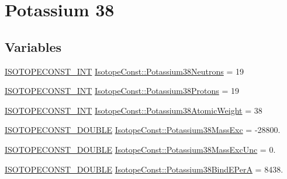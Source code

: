\hypertarget{group___isotope_const-_potassium-_k38}{}\section{Potassium 38}
\label{group___isotope_const-_potassium-_k38}
\subsection*{Variables}
\begin{DoxyCompactItemize}
\item 
\mbox{\hyperlink{group___isotope_const-_macros_ga5f18360b3e99483a35c32d789e62621c}{I\+S\+O\+T\+O\+P\+E\+C\+O\+N\+S\+T\+\_\+\+I\+NT}} \mbox{\hyperlink{group___isotope_const-_potassium-_k38_ga20525e9ff4021c64c6def533ea2b3036}{Isotope\+Const\+::\+Potassium38\+Neutrons}} = 19
\item 
\mbox{\hyperlink{group___isotope_const-_macros_ga5f18360b3e99483a35c32d789e62621c}{I\+S\+O\+T\+O\+P\+E\+C\+O\+N\+S\+T\+\_\+\+I\+NT}} \mbox{\hyperlink{group___isotope_const-_potassium-_k38_ga781bd2a6ff81f406e0a633fef6e0f3a6}{Isotope\+Const\+::\+Potassium38\+Protons}} = 19
\item 
\mbox{\hyperlink{group___isotope_const-_macros_ga5f18360b3e99483a35c32d789e62621c}{I\+S\+O\+T\+O\+P\+E\+C\+O\+N\+S\+T\+\_\+\+I\+NT}} \mbox{\hyperlink{group___isotope_const-_potassium-_k38_ga14a408117435036223d328c3d5228bdb}{Isotope\+Const\+::\+Potassium38\+Atomic\+Weight}} = 38
\item 
\mbox{\hyperlink{group___isotope_const-_macros_ga8f45a7272ce02c0b4c65c44636ed719a}{I\+S\+O\+T\+O\+P\+E\+C\+O\+N\+S\+T\+\_\+\+D\+O\+U\+B\+LE}} \mbox{\hyperlink{group___isotope_const-_potassium-_k38_gadd55fa10b57e469b31ebe65a9653dc12}{Isotope\+Const\+::\+Potassium38\+Mass\+Exc}} = -\/28800.
\item 
\mbox{\hyperlink{group___isotope_const-_macros_ga8f45a7272ce02c0b4c65c44636ed719a}{I\+S\+O\+T\+O\+P\+E\+C\+O\+N\+S\+T\+\_\+\+D\+O\+U\+B\+LE}} \mbox{\hyperlink{group___isotope_const-_potassium-_k38_gaf2364423083327d39e3b2eb6daadddf0}{Isotope\+Const\+::\+Potassium38\+Mass\+Exc\+Unc}} = 0.
\item 
\mbox{\hyperlink{group___isotope_const-_macros_ga8f45a7272ce02c0b4c65c44636ed719a}{I\+S\+O\+T\+O\+P\+E\+C\+O\+N\+S\+T\+\_\+\+D\+O\+U\+B\+LE}} \mbox{\hyperlink{group___isotope_const-_potassium-_k38_ga214595b3366cc8fe6fb7b8435e29e448}{Isotope\+Const\+::\+Potassium38\+Bind\+E\+PerA}} = 8438.
\item 

\end{DoxyCompactItemize}
